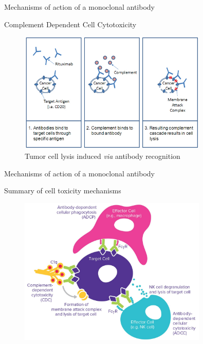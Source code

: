 \begin{frame}{Mechanisms of action of a monoclonal antibody}
    \begin{block}{Complement Dependent Cell Cytotoxicity}
        \begin{figure}
            \centering
            \includegraphics[width=0.8\textwidth]{../Images/complement-dependent-cellular-cytotoxicity.jpg}
            \caption{Tumor cell lysis induced \emph{via} antibody recognition}
            \label{fig:CDCC}
        \end{figure}
    \end{block}
\end{frame}

\begin{frame}{Mechanisms of action of a monoclonal antibody}
    \begin{block}{Summary of cell toxicity mechanisms}
        \begin{figure}
            \centering
            \includegraphics[width=0.8\textwidth]{../Images/recap_toxicity.jpg}
            \label{fig:summary}
        \end{figure}
    \end{block}
\end{frame}